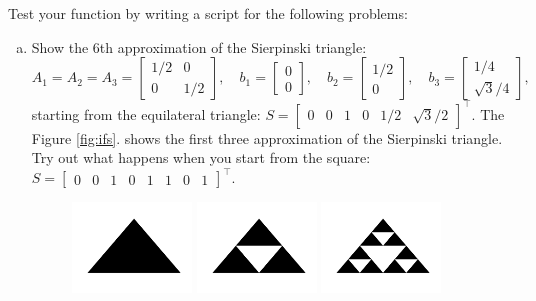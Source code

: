 \documentclass[a4paper, fleqn, 10pt]{report}
\theoremstyle{definition}
\begin{document}
Test your function by writing a script for the following problems:
\begin{enumerate}[a)]
 \item Show the 6th approximation of the Sierpinski triangle:
 \[A_1 = A_2 = A_3 = \begin{bmatrix}
          1/2 & 0\\
          0   & 1/2
         \end{bmatrix},\quad
         b_1 = \begin{bmatrix}
          0 \\
          0  
         \end{bmatrix},\quad
         b_2 = \begin{bmatrix}
          1/2 \\
          0  
         \end{bmatrix},\quad
         b_3 = \begin{bmatrix}
          1/4 \\
          \sqrt{3}/4
         \end{bmatrix},
\]
starting from the equilateral triangle: $S=\begin{bmatrix}0 & 0 & 1 & 0 & 1/2 & \sqrt{3}/2\end{bmatrix}^\top.$
The Figure \ref{fig:ifs}. shows the first three approximation of the Sierpinski triangle.
Try out what happens when you start from the square: $S=\begin{bmatrix}0 & 0 & 1 & 0 & 1 & 1 & 0 & 1\end{bmatrix}^\top.$
\begin{figure}[ht!]
\centering
  \includegraphics[width=0.3\textwidth]{ifs1}
  \includegraphics[width=0.3\textwidth]{ifs2}
  \includegraphics[width=0.3\textwidth]{ifs3}

\end{figure}
\end{enumerate}
\end{document}
